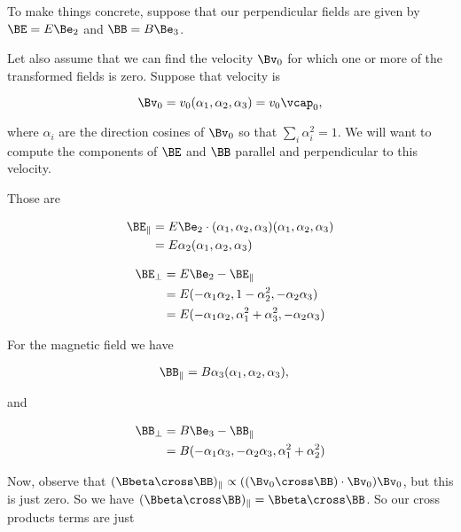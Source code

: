 To make things concrete, suppose that our perpendicular fields are given by $\BE = E \Be_2$ and $\BB = B \Be_3$.

Let also assume that we can find the velocity $\Bv_0$ for which one or more of the transformed fields is zero.  Suppose that velocity is

\begin{equation}\label{eqn:relElectroDynProblemSet3:1480}
\Bv_0 = v_0 (\alpha_1, \alpha_2, \alpha_3) = v_0 \vcap_0,
\end{equation}

where $\alpha_i$ are the direction cosines of $\Bv_0$ so that $\sum_i \alpha_i^2 = 1$.  We will want to compute the components of $\BE$ and $\BB$ parallel and perpendicular to this velocity.

Those are

\begin{align*}
\BE_\parallel 
&= E \Be_2 \cdot (\alpha_1, \alpha_2, \alpha_3) (\alpha_1, \alpha_2, \alpha_3) \\
&= E \alpha_2 (\alpha_1, \alpha_2, \alpha_3) \\
\end{align*}

\begin{align*}
\BE_\perp 
&= E \Be_2 - \BE_\parallel \\
&= E (-\alpha_1 \alpha_2, 1 - \alpha_2^2, -\alpha_2 \alpha_3) \\
&= E (-\alpha_1 \alpha_2, \alpha_1^2 + \alpha_3^2, -\alpha_2 \alpha_3) \\
\end{align*}

For the magnetic field we have

\begin{align*}
\BB_\parallel 
&= B \alpha_3 (\alpha_1, \alpha_2, \alpha_3),
\end{align*}

and

\begin{align*}
\BB_\perp 
&= B \Be_3 - \BB_\parallel \\
&= B (-\alpha_1 \alpha_3, -\alpha_2 \alpha_3, \alpha_1^2 + \alpha_2^2)  \\
\end{align*}

Now, observe that $(\Bbeta \cross \BB)_\parallel \propto ((\Bv_0 \cross \BB) \cdot \Bv_0) \Bv_0$, but this is just zero.  So we have $(\Bbeta \cross \BB)_\parallel = \Bbeta \cross \BB$.  So our cross products terms are just

